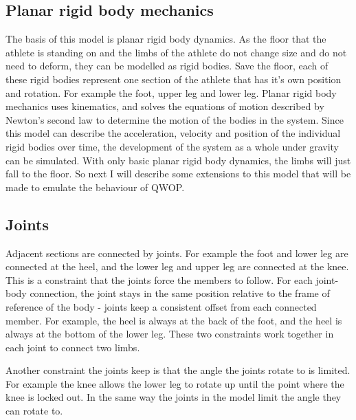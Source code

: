 \documentclass[12pt,a4paper,twoside,openright]{report}
\begin{document}
\subsection{Planar rigid body mechanics}
\label{prbm}

The basis of this model is planar rigid body dynamics.
As the floor that the athlete is standing on and the limbs of the athlete do not change size and do not need to deform, they can be modelled as rigid bodies.
Save the floor, each of these rigid bodies represent one section of the athlete that has it's own position and rotation. For example the foot, upper leg and lower leg.
Planar rigid body mechanics uses kinematics, and solves the equations of motion described by Newton's second law to determine the motion of the bodies in the system.
Since this model can describe the acceleration, velocity and position of the individual rigid bodies over time, the development of the system as a whole under gravity can be simulated.
With only basic planar rigid body dynamics, the limbs will just fall to the floor. So next I will describe some extensions to this model that will be made to emulate the behaviour of QWOP.

\subsection{Joints}
\label{sub:joints}

Adjacent sections are connected by joints. For example the foot and lower leg are connected at the heel, and the lower leg and upper leg are connected at the knee.
This is a constraint that the joints force the members to follow. For each joint-body connection, the joint stays in the same position relative to the frame of reference of the body - joints keep a consistent offset from each connected member. For example, the heel is always at the back of the foot, and the heel is always at the bottom of the lower leg. These two constraints work together in each joint to connect two limbs.

Another constraint the joints keep is that the angle the joints rotate to is limited. For example the knee allows the lower leg to rotate up until the point where the knee is locked out. In the same way the joints in the model limit the angle they can rotate to.
\end{document}
